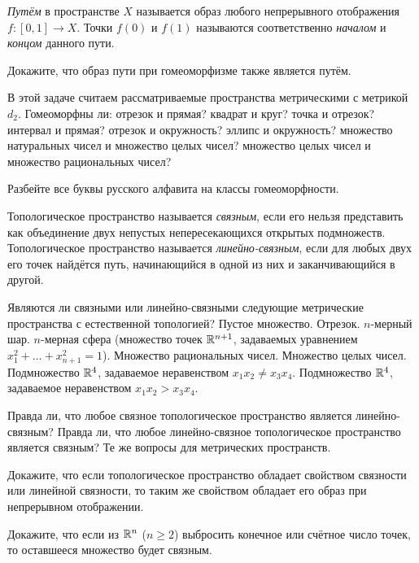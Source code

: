 \documentclass[a4paper,11pt]{article}
\begin{document}
    \emph{Путём} в пространстве $X$ называется образ любого непрерывного отображения $f\colon [0,1] \to X$. Точки $f(0)$ и $f(1)$ называются соответственно \emph{началом} и \emph{концом} данного пути.

    Докажите, что образ пути при гомеоморфизме также является путём.

    В этой задаче считаем рассматриваемые пространства метрическими с метрикой $d_2$. Гомеоморфны ли:
     отрезок и прямая?
     квадрат и круг?
     точка и отрезок?
     интервал и прямая?
     отрезок и окружность?
     эллипс и окружность?
     множество натуральных чисел и множество целых чисел?
     множество целых чисел и множество рациональных чисел?

    Разбейте все буквы русского алфавита на классы гомеоморфности.

    Топологическое пространство называется \emph{связным}, если его нельзя представить как объединение двух непустых непересекающихся открытых подмножеств. Топологическое пространство называется \emph{линейно-связным}, если для любых двух его точек найдётся путь, начинающийся в одной из них и заканчивающийся в другой.

    Являются ли связными или линейно-связными следующие метрические пространства с естественной топологией?
     Пустое множество.
     Отрезок.
     $n$-мерный шар.
     $n$-мерная сфера (множество точек $\mathbb{R}^{n+1}$, задаваемых уравнением $x_1^2 + \dots + x_{n+1}^2 = 1$).
     Множество рациональных чисел.
     Множество целых чисел.
     Подмножество $\mathbb{R}^4$, задаваемое неравенством $x_1x_2 \neq x_3x_4$.
     Подмножество $\mathbb{R}^4$, задаваемое неравенством $x_1x_2 > x_3x_4$.

    Правда ли, что любое связное топологическое пространство является линейно-связным?
    Правда ли, что любое линейно-связное топологическое пространство является связным?
    Те же вопросы для метрических пространств.

    Докажите, что если топологическое пространство обладает свойством связности или линейной связности, то таким же свойством обладает его образ при непрерывном отображении.

    Докажите, что если из $\mathbb{R}^n$ ($n \ge 2$) выбросить конечное или счётное число точек, то оставшееся множество будет связным.
\end{document}
